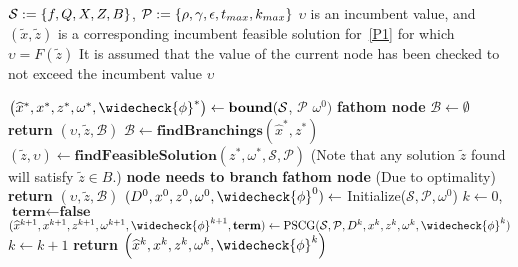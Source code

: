 \begin{algorithm}[H]
\begin{algorithmic}
 \State \quad\quad$\mathcal{S}:=\left\{ f,Q,X,Z,B \right \}$, $\mathcal{P}:=\left\{ \rho,\gamma, \epsilon, t_{max}, k_{max} \right \}$
 \State \quad\quad$\upsilon$ is an incumbent value, and 
 \State \quad\quad$\left( \widetilde{x}, \widetilde{z} \right)$ is a corresponding incumbent feasible solution for~\eqref{P1} for which $\upsilon = F(\widetilde{z})$
 \State \quad\quad It is assumed that the value of the current node has been checked to not exceed the incumbent value $\upsilon$ 
\end{algorithmic}
\begin{algorithmic}
  \State $\left(\widehat{x}^{*},x^{*},z^{*},\omega^{*},\widecheck{\phi}^{*}\right) \gets \textbf{bound}(\mathcal{S}$, $\mathcal{P}$ $\omega^0)$
{}
 \State \textbf{fathom node}
 \State $\mathcal{B} \gets \emptyset$
 \State \textbf{return} $(\upsilon, \widetilde{z}, \mathcal{B})$
\EndIf
\State $\mathcal{B} \gets \textbf{findBranchings}(\widehat{x}^{*}, z^{*})$
\State $(\widetilde{z},\upsilon) \gets \textbf{findFeasibleSolution}(z^{*},\omega^{*},\mathcal{S},\mathcal{P})$ (Note that any solution $\widetilde{z}$ found will satisfy $\widetilde{z} \in B$.)
\State \textbf{node needs to branch}
\Else
\State \textbf{fathom node}  (Due to optimality)
\EndIf
\State \textbf{return} $(\upsilon, \widetilde{z}, \mathcal{B})$
\EndFunction
{}
\State $(D^0,x^0,z^0,\omega^0,\widecheck{\phi}^0) \gets$ Initialize($\mathcal{S},\mathcal{P},\omega^0$)
\State $k \gets 0$, $\textbf{term}\gets\textbf{false}$
 \State $(\widehat{x}^{k+1},x^{k+1},z^{k+1},\omega^{k+1},\widecheck{\phi}^{k+1}, \textbf{term}) \gets \text{PSCG}(\mathcal{S},\mathcal{P},D^k,x^k,z^k,\omega^k,\widecheck{\phi}^k)$
 \State $k \gets k+1$
\EndWhile
\State \textbf{return} $\left(\widehat{x}^{k},x^{k},z^{k},\omega^{k},\widecheck{\phi}^{k}\right)$
\EndFunction
\end{algorithmic}
\end{algorithm}



